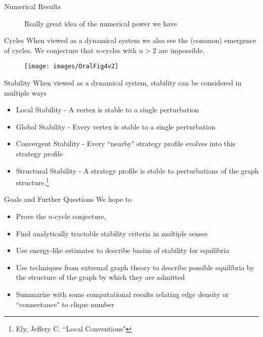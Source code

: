 \documentclass{beamer}
\begin{document}
\begin{frame}{Numerical Results}
	\begin{figure}
		\caption{Really great idea of the numerical power we have}
	\end{figure}
\end{frame}

\begin{frame}{Cycles}
	When viewed as a dynamical system we also see the (common) emergence of cycles. We conjecture that $n$-cycles with $n>2$ are impossible. 
	\begin{figure}
		\texttt{[image: images/OralFig4v2]}
	\end{figure} 
\end{frame}

\begin{frame}{Stability}
	When viewed as a dynamical system, stability can be considered in multiple ways 
	\begin{itemize}
		\item Local Stability - A vertex is stable to a single perturbation
		\item Global Stability - Every vertex is stable to a single perturbation
		\item Convergent Stability - Every ``nearby" strategy profile evolves into this strategy profile
		\item Structural Stability - A strategy profile is stable to perturbations of the graph structure.\footnote{Ely, Jeffery C. ``Local Conventions"}
	\end{itemize}
\end{frame}

\begin{frame}{Goals and Further Questions}
	We hope to 
	\begin{itemize}
		\item Prove the $n$-cycle conjecture,
		\item Find analytically tractable stability criteria in multiple senses
		\item Use energy-like estimates to describe basins of stability for equilibria
		\item Use techniques from extremal graph theory to describe possible equilibria by the structure of the graph by which they are admitted
		\item Summarize with some computational results relating edge density or ``connectance" to clique number 
	\end{itemize}
\end{frame}
\end{document}
